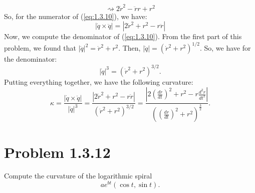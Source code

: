 \documentclass[12pt]{article}
\newcommand\abs[1]{\left| #1 \right|}
\newcommand\parens[1]{\left( #1 \right)}
\begin{document}
{    \[\rightsquigarrow 2\dot{r}^2 - \ddot{r}r + r^2\]
    So, for the numerator of (\ref{eq:1.3.10}), we have:
    \[\abs{\dot{q} \times \ddot{q}} = \abs{2\dot{r}^2 + r^2 - r\ddot{r}}\]
    Now, we compute the denominator of (\ref{eq:1.3.10}). From the first part of this problem, we found that $\abs{\dot{q}}^2 = \dot{r}^2 + r^2$. Then, $\abs{\dot{q}} = \parens{\dot{r}^2 + r^2}^{1/2}$. So, we have for the denominator:
    \[\abs{\dot{q}}^3 = \parens{\dot{r}^2 + r^2}^{3/2}.\]
    Putting everything together, we have the following curvature:
    \[\kappa = \frac{\abs{\dot{q} \times \ddot{q}}}{\abs{\dot{q}}^3} = \frac{\abs{2\dot{r}^2 + r^2 - r\ddot{r}}}{\parens{\dot{r}^2 + r^2}^{3/2}} = \frac{\abs{2\parens{\frac{dr}{dt}}^2 + r^2 - r \frac{d^2r}{dt^2}}}{\parens{\parens{\frac{dr}{dt}}^2 + r^2}^{\frac{3}{2}}}.\]
}

\section*{Problem 1.3.12}
Compute the curvature of the logarithmic spiral
\[ae^{bt} (\cos t, \sin t).\]
\end{document}
